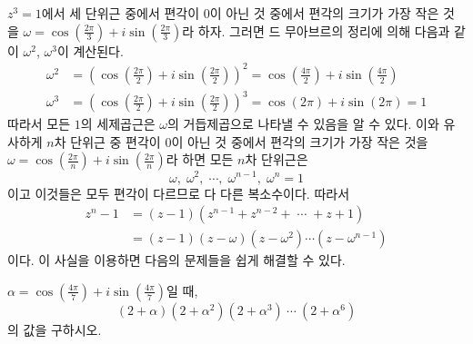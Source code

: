 \documentclass[11pt, a4paper]{book}
\begin{document}
\vspace{1em}
 $z^{3}=1$에서 세 단위근 중에서 편각이 $0$이 아닌 것 중에서 편각의 크기가 가장 작은 것을 $\omega=\cos\left(\frac{2\pi}{3}\right) + i \sin\left(\frac{2\pi}{3}\right)$라 하자. 그러면 드 무아브르의 정리에 의해 다음과 같이 $\omega^{2}$, $\omega^{3}$이 계산된다.
 \begin{align*}
 	\omega^{2} &= \left(\cos\left(\frac{2\pi}{2}\right)+ i \sin\left(\frac{2\pi}{2}\right)\right)^{2} = \cos\left(\frac{4\pi}{2}\right)+ i \sin\left(\frac{4\pi}{2}\right) \\
 	\omega^{3} &= \left(\cos\left(\frac{2\pi}{2}\right)+ i \sin\left(\frac{2\pi}{2}\right)\right)^{3} = \cos\left(2\pi\right)+ i \sin\left(2\pi\right) =1
 \end{align*}
따라서 모든 $1$의 세제곱근은 $\omega$의 거듭제곱으로 나타낼 수 있음을 알 수 있다. 이와 유사하게 $n$차 단위근 중 편각이 $0$이 아닌 것 중에서 편각의 크기가 가장 작은 것을 $\omega=\cos\left(\frac{2\pi}{n}\right) + i \sin\left(\frac{2\pi}{n}\right)$라 하면 모든 $n$차 단위근은
\begin{equation*}
	\omega, \; \omega^{2},\; \cdots, \;\omega^{n-1}, \; \omega^{n}=1
\end{equation*}
이고 이것들은 모두 편각이 다르므로 다 다른 복소수이다. 따라서
\begin{align*}
	z^{n}-1 &= (z-1)\left( z^{n-1} +z^{n-2} + \; \cdots \; + z+1\right) \\
	&= \left(z-1\right)\left(z-\omega\right)\left(z-\omega^{2}\right) \cdots \left(z-\omega^{n-1}\right)
\end{align*}%
이다. 이 사실을 이용하면 다음의 문제들을 쉽게 해결할 수 있다.
\vspace{1em}
\begin{problem}
	$\alpha = \cos\left(\frac{4\pi}{7}\right) + i \sin\left(\frac{4\pi}{7}\right)$일 때,
	\begin{equation*}
		(2+\alpha)(2+\alpha^{2})(2+\alpha^{3})  \: \cdots \:  (2+\alpha^{6})
	\end{equation*}
의 값을 구하시오.
\end{problem}
\end{document}
